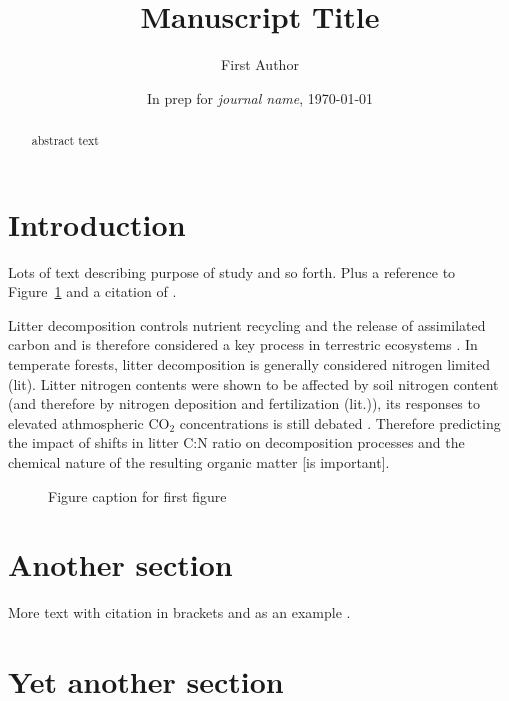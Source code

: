 \documentclass[agums]{aguplus}  %
\begin{document}

\title{Manuscript Title}
\author{First Author}
\author{In prep for {\it journal name}, \today}  %

\begin{abstract}
abstract text

\noindent
\end{abstract}

\section{Introduction}

Lots of text describing purpose of study and so forth.  Plus a reference to Figure~\ref{figure1.ps} and a citation of \cite{test1}.

Litter decomposition controls nutrient recycling and the release of assimilated carbon and is therefore considered a key process in terrestric ecosystems \citep{Prescott2010}. In temperate forests, litter decomposition is generally considered nitrogen limited (lit). Litter nitrogen contents were shown to be affected by soil nitrogen content (and therefore by nitrogen deposition and fertilization (lit.)), its responses to elevated athmospheric CO$_{2}$ concentrations is still debated \citep{Luo2006, Norby1998}. Therefore predicting the impact of shifts in litter C:N ratio on decomposition processes and the chemical nature of the resulting organic matter [is important]. 


\begin{figure}
\caption[]{Figure caption for first figure}
\label{figure1.ps}
\end{figure}

\section{Another section}
\label{section2.sec}

More text with citation in brackets \cite[]{test2} and as an example 
\cite[e.g.][]{test1}.

\section{Yet another section}
\end{document}
